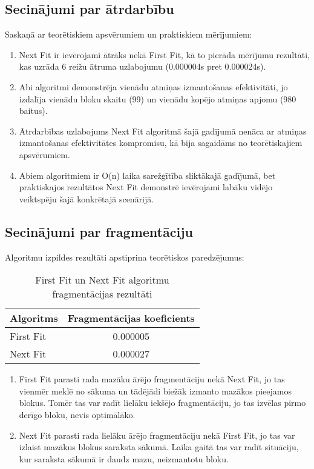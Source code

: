 \documentclass{report}
\begin{document}
	\subsection{Secinājumi par ātrdarbību}
	
	Saskaņā ar teorētiskiem apsvērumiem un praktiskiem mērījumiem:
	
	\begin{enumerate}
		\item Next Fit ir ievērojami ātrāks nekā First Fit, kā to pierāda mērījumu rezultāti, kas uzrāda 6 reižu ātruma uzlabojumu (0.000004s pret 0.000024s).
		
		\item Abi algoritmi demonstrēja vienādu atmiņas izmantošanas efektivitāti, jo izdalīja vienādu bloku skaitu (99) un vienādu kopējo atmiņas apjomu (980 baitus).
		
		\item Ātrdarbības uzlabojums Next Fit algoritmā šajā gadījumā nenāca ar atmiņas izmantošanas efektivitātes kompromisu, kā bija sagaidāms no teorētiskajiem apsvērumiem.
		
		\item Abiem algoritmiem ir O(n) laika sarežģītība sliktākajā gadījumā, bet praktiskajos rezultātos Next Fit demonstrē ievērojami labāku vidējo veiktspēju šajā konkrētajā scenārijā.
	\end{enumerate}
	
	\subsection{Secinājumi par fragmentāciju}
	Algoritmu izpildes rezultāti apstiprina teorētiskos paredzējumus:

	\begin{table}[h]
		\centering
		\begin{tabular}{lc}
			\toprule
			\textbf{Algoritms} & \textbf{Fragmentācijas koeficients} \\
			\midrule
			First Fit & 0.000005 \\
			Next Fit & 0.000027 \\
			\bottomrule
		\end{tabular}
		\caption{First Fit un Next Fit algoritmu fragmentācijas rezultāti}
		\label{tab:fragmentation}
	\end{table}	
	
	\begin{enumerate}
		\item First Fit parasti rada mazāku ārējo fragmentāciju nekā Next Fit, jo tas vienmēr meklē no sākuma un tādējādi biežāk izmanto mazākos pieejamos blokus. Tomēr tas var radīt lielāku iekšējo fragmentāciju, jo tas izvēlas pirmo derīgo bloku, nevis optimālāko.
		
		\item Next Fit parasti rada lielāku ārējo fragmentāciju nekā First Fit, jo tas var izlaist mazākus blokus saraksta sākumā. Laika gaitā tas var radīt situāciju, kur saraksta sākumā ir daudz mazu, neizmantotu bloku.
	\end{enumerate}
	
\end{document}
